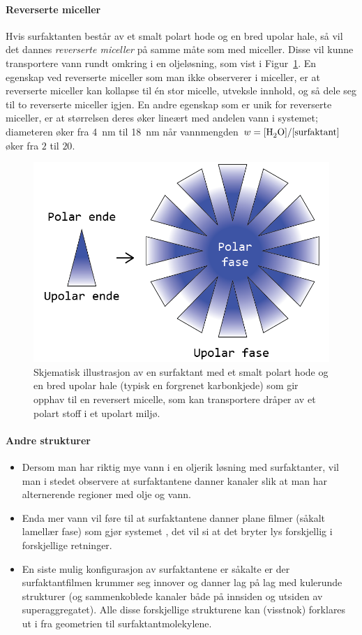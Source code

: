\paragraph{Reverserte miceller} Hvis surfaktanten består av et smalt polart hode og en bred upolar hale, så vil det dannes \emph{reverserte miceller} på samme måte som med miceller. Disse vil kunne transportere vann rundt omkring i en oljeløsning, som vist i Figur~\ref{fig:reversemicelle}. En egenskap ved reverserte miceller som man ikke observerer i miceller, er at reverserte miceller kan kollapse til én stor micelle, utveksle innhold, og så dele seg til to reverserte miceller igjen. En andre egenskap som er unik for reverserte miceller, er at størrelsen deres øker lineært med andelen vann i systemet; diameteren øker fra \SI{4}{\nano\meter} til \SI{18}{\nano\meter} når vannmengden $w=[\ce{H2O}]/[\ce{surfaktant}]$ øker fra $2$ til $20$.
\begin{figure}[H]
	\bmd\centering
	\includegraphics[width=0.8\linewidth]{reversemicelle.png}
	\caption{Skjematisk illustrasjon av en surfaktant med et smalt polart hode og en bred upolar hale (typisk en forgrenet karbonkjede) som gir opphav til en reversert micelle, som kan transportere dråper av et polart stoff i et upolart miljø.}
	\label{fig:reversemicelle}
\emd\end{figure}

\paragraph{Andre strukturer}
\begin{itemize}
	\item Dersom man har riktig mye vann i en oljerik løsning med surfaktanter, vil man i stedet observere at surfaktantene danner kanaler slik at man har alternerende regioner med olje og vann.
	\item Enda mer vann vil føre til at surfaktantene danner plane filmer (såkalt lamellær fase) som gjør systemet , det vil si at det bryter lys forskjellig i forskjellige retninger.
	\item En siste mulig konfigurasjon av surfaktantene er såkalte er der surfaktantfilmen krummer seg innover og danner lag på lag med kulerunde strukturer (og sammenkoblede kanaler både på innsiden og utsiden av superaggregatet). Alle disse forskjellige strukturene kan (visstnok) forklares ut i fra geometrien til surfaktantmolekylene.
\end{itemize}

